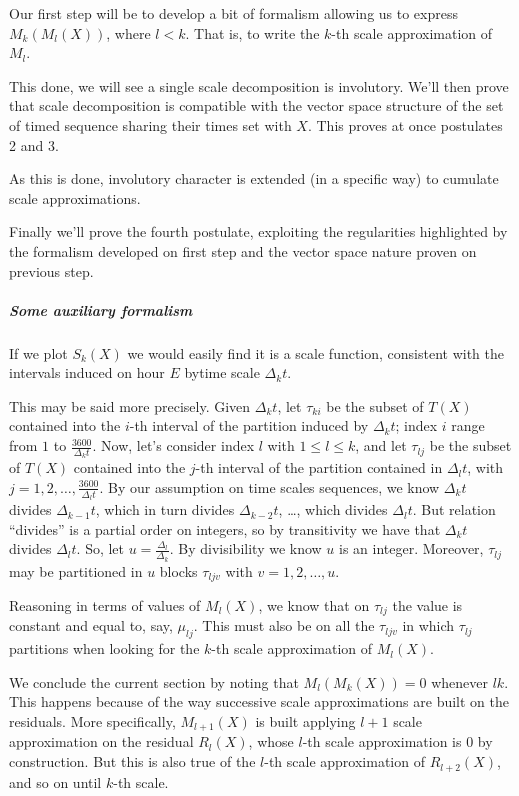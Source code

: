 \documentclass[a4paper,10pt]{book}
\begin{document}
Our first step will be to develop a bit of formalism allowing us to express $M_{k}(M_{l}(X))$, where $l < k$. That is, to write the $k$-th scale approximation of $M_{l}$.

This done, we will see a single scale decomposition is involutory. We'll then prove that scale decomposition is compatible with the vector space structure of the set of timed sequence sharing their times set with $X$. This proves at once postulates 2 and 3.

As this is done, involutory character is extended (in a specific way) to cumulate scale approximations.

Finally we'll prove the fourth postulate, exploiting the regularities highlighted by the formalism developed on first step and the vector space nature proven on previous step.


\subparagraph{Some auxiliary formalism}

If we plot $S_{k}(X)$ we would easily find it is a scale function, consistent with the intervals induced on hour $E$ bytime scale $\Delta_{k} t$.

This may be said more precisely. Given $\Delta_{k} t$, let $\tau_{ki}$ be the subset of $T(X)$ contained into the $i$-th interval of the partition induced by $\Delta_{k} t$; index $i$ range from $1$ to $\frac{3600}{\Delta_{k} t}$. Now, let's consider index $l$ with  $1 \le l \le k$, and let $\tau_{lj}$ be the subset of $T(X)$ contained into the $j$-th interval of the partition contained in $\Delta_{l} t$, with $j = 1,2, \ldots, \frac{3600}{\Delta_{l} t}$. By our assumption on time scales sequences, we know $\Delta_{k} t$ divides $\Delta_{k-1} t$, which in turn divides $\Delta_{k-2} t$, \ldots, which divides $\Delta_{l} t$. But relation ``divides'' is a partial order on integers, so by transitivity we have that $\Delta_{k} t$ divides $\Delta_{l} t$. So, let $u = \frac{\Delta_{l}}{\Delta_{k}}$. By divisibility we know $u$ is an integer. Moreover, $\tau_{lj}$ may be partitioned in $u$ blocks $\tau_{ljv}$ with $v = 1, 2, \ldots, u$.

Reasoning in terms of values of $M_{l}(X)$, we know that on $\tau_{lj}$ the value is constant and equal to, say, $\mu_{lj}$. This must also be on all the $\tau_{ljv}$ in which $\tau_{lj}$ partitions when looking for the $k$-th scale approximation of  $M_{l}(X)$.

We conclude the current section by noting that $M_{l}(M_{k}(X)) = 0$ whenever $l  k$. This happens because of the way successive scale approximations are built on the residuals. More specifically, $M_{l+1}(X)$ is built applying $l+1$ scale approximation on the residual $R_{l}(X)$, whose $l$-th scale approximation is 0 by construction. But this is also true of the $l$-th scale approximation of $R_{l+2}(X)$, and so on until $k$-th scale.
\end{document}
